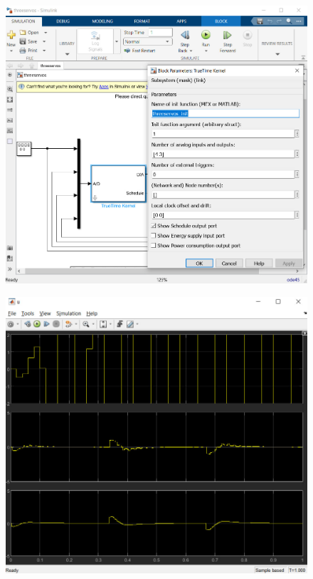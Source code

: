 \begin{figure}[H]
	\centering
	\includegraphics{7.jpg}
	\label{fig:label4}
\end{figure}

\begin{figure}[H]
	\centering
	\includegraphics{8.jpg}
	\label{fig:label4}
\end{figure}

